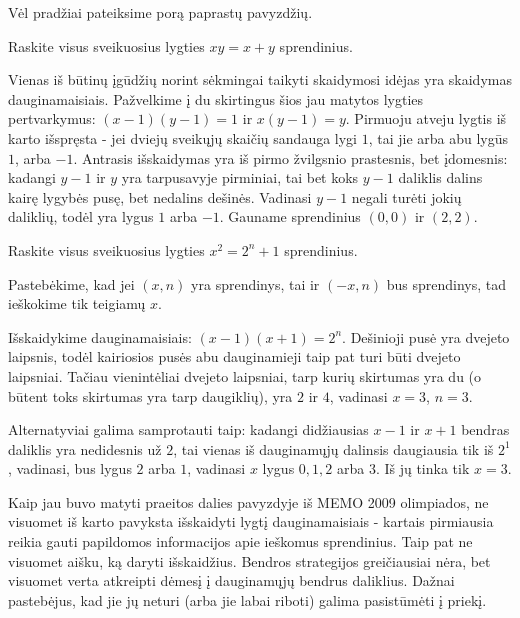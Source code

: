 Vėl pradžiai pateiksime porą paprastų pavyzdžių.

\begin{pav} Raskite visus sveikuosius lygties $xy = x + y$ sprendinius.
\end{pav}

\begin{sprendimas}
  Vienas iš būtinų įgūdžių norint sėkmingai taikyti skaidymosi idėjas
  yra skaidymas dauginamaisiais. Pažvelkime į du skirtingus šios jau
  matytos lygties
  pertvarkymus: $(x-1)(y-1) = 1$ ir $x(y-1) = y$. Pirmuoju atveju lygtis iš
  karto išspręsta - jei dviejų sveikųjų skaičių sandauga lygi $1$, tai jie
  arba abu lygūs $1$, arba $-1$. Antrasis išskaidymas yra iš pirmo žvilgsnio
  prastesnis, bet įdomesnis: kadangi $y-1$ ir $y$ yra tarpusavyje
  pirminiai, tai bet koks $y-1$ daliklis dalins kairę lygybės pusę, bet
  nedalins dešinės. Vadinasi $y-1$ negali turėti jokių daliklių, todėl
  yra lygus $1$ arba $-1$. Gauname sprendinius $(0, 0)$ ir $(2, 2)$.  
\end{sprendimas}

\begin{pav} Raskite visus sveikuosius lygties $x^2 = 2^n + 1$ sprendinius.
\end{pav}

\begin{sprendimas}
  Pastebėkime, kad jei $(x,n)$ yra sprendinys, tai ir $(-x,n)$ bus
  sprendinys, tad ieškokime tik teigiamų $x$.

  Išskaidykime dauginamaisiais: $(x-1)(x+1) = 2^n$. Dešinioji pusė yra
  dvejeto laipsnis, todėl kairiosios pusės abu dauginamieji taip pat turi
  būti dvejeto laipsniai. Tačiau vienintėliai dvejeto laipsniai, tarp kurių
  skirtumas yra du (o būtent toks skirtumas yra tarp daugiklių), yra
  $2$ ir $4$, vadinasi $x=3$, $n=3$.

  Alternatyviai galima samprotauti taip: kadangi didžiausias $x-1$ ir
  $x+1$ bendras daliklis yra nedidesnis už $2$, tai vienas iš dauginamųjų
  dalinsis daugiausia tik iš $2^1$, vadinasi, bus lygus $2$ arba $1$,
  vadinasi $x$ lygus $0, 1, 2$ arba $3$. Iš jų tinka tik $x=3$.
\end{sprendimas}

Kaip jau buvo matyti praeitos dalies pavyzdyje iš MEMO 2009 olimpiados,
ne visuomet iš karto pavyksta išskaidyti lygtį dauginamaisiais - kartais
pirmiausia reikia gauti papildomos informacijos apie ieškomus sprendinius.
Taip pat ne visuomet aišku, ką daryti išskaidžius. Bendros strategijos
greičiausiai nėra, bet visuomet verta atkreipti dėmesį į dauginamųjų bendrus
daliklius. Dažnai pastebėjus, kad jie jų neturi (arba jie labai riboti) galima
pasistūmėti į priekį. 

